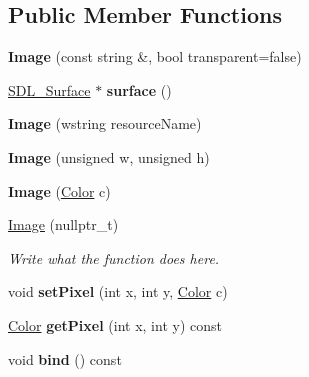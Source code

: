 \subsection*{Public Member Functions}
\begin{DoxyCompactItemize}
\item 
\hypertarget{classImage_a5408754295f3c928f514504a1af7f0d6}{{\bfseries Image} (const string \&, bool transparent=false)}\label{classImage_a5408754295f3c928f514504a1af7f0d6}

\item 
\hypertarget{classImage_a18ae111e701a052087cc2ac6546f3c3f}{\hyperlink{structSDL__Surface}{S\+D\+L\+\_\+\+Surface} $\ast$ {\bfseries surface} ()}\label{classImage_a18ae111e701a052087cc2ac6546f3c3f}

\item 
\hypertarget{classImage_a54e0042d9eac7f20a1dab76683fe9c7f}{{\bfseries Image} (wstring resource\+Name)}\label{classImage_a54e0042d9eac7f20a1dab76683fe9c7f}

\item 
\hypertarget{classImage_a9b680c47c5cbcdb5e40cbafda9f01585}{{\bfseries Image} (unsigned w, unsigned h)}\label{classImage_a9b680c47c5cbcdb5e40cbafda9f01585}

\item 
\hypertarget{classImage_ae464aed23c1ff34ad69d6a523035c8f9}{{\bfseries Image} (\hyperlink{structColor}{Color} c)}\label{classImage_ae464aed23c1ff34ad69d6a523035c8f9}

\item 
\hyperlink{classImage_aeadd5d847590baf1a1dc8956476bb78e}{Image} (nullptr\+\_\+t)
\begin{DoxyCompactList}\small\item\em Write what the function does here. \end{DoxyCompactList}\item 
\hypertarget{classImage_a26e062a056015a1aebf4bbc9961646d5}{void {\bfseries set\+Pixel} (int x, int y, \hyperlink{structColor}{Color} c)}\label{classImage_a26e062a056015a1aebf4bbc9961646d5}

\item 
\hypertarget{classImage_a39c099122fc2bb6f0ed9ad4080681b1a}{\hyperlink{structColor}{Color} {\bfseries get\+Pixel} (int x, int y) const }\label{classImage_a39c099122fc2bb6f0ed9ad4080681b1a}

\item 
\hypertarget{classImage_aca8eb96b468eaeaf83df9141c0710a8b}{void {\bfseries bind} () const }\label{classImage_aca8eb96b468eaeaf83df9141c0710a8b}


\end{DoxyCompactItemize}
